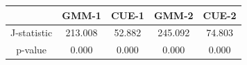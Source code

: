 \begin{table}[ht]
\centering
\begin{tabular}{ccccc}
  \hline
 & GMM-1 & CUE-1 & GMM-2 & CUE-2 \\ 
  \hline
J-statistic & 213.008 & 52.882 & 245.092 & 74.803 \\ 
  p-value & 0.000 & 0.000 & 0.000 & 0.000 \\ 
   \hline
\end{tabular}
\end{table}

